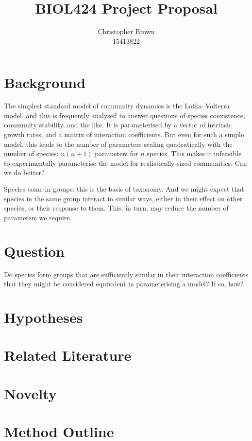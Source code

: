 \documentclass[a4paper,11pt]{article}
\title{BIOL424 Project Proposal}
\author{
	Christopher Brown\\15413822
}
\date{}
\begin{document}
\maketitle

\section{Background}

The simplest standard model of community dynamics is the Lotka--Volterra model, and this is frequently analysed to answer questions of species coexistence, community stability, and the like.
It is parameterised by a vector of intrinsic growth rates, and a matrix of interaction coefficients.
But even for such a simple model, this leads to the number of parameters scaling quadratically with the number of species: $n(n+1)$ parameters for $n$ species.
This makes it infeasible to experimentally parameterise the model for realistically-sized communities.
Can we do better?

Species come in groups: this is the basis of taxonomy.
And we might expect that species in the same group interact in similar ways, either in their effect on other species, or their response to them.
This, in turn, may reduce the number of parameters we require.

\section{Question}

Do species form groups that are sufficiently similar in their interaction coefficients that they might be considered equivalent in parameterising a model?
If so, how?

\section{Hypotheses}

\section{Related Literature}

\section{Novelty}

\section{Method Outline}

\FloatBarrier
\printbibliography
\end{document}

